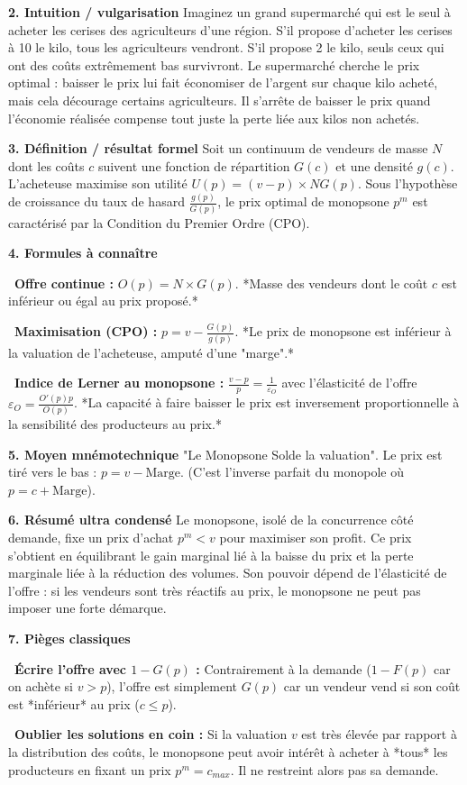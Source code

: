\documentclass[11pt, a4paper]{report}
\begin{document}
\textbf{2. Intuition / vulgarisation}
Imaginez un grand supermarché qui est le seul à acheter les cerises des agriculteurs d'une région. S'il propose d'acheter les cerises à 10\texteuro{} le kilo, tous les agriculteurs vendront. S'il propose 2\texteuro{} le kilo, seuls ceux qui ont des coûts extrêmement bas survivront. Le supermarché cherche le prix optimal : baisser le prix lui fait économiser de l'argent sur chaque kilo acheté, mais cela décourage certains agriculteurs. Il s'arrête de baisser le prix quand l'économie réalisée compense tout juste la perte liée aux kilos non achetés.

\textbf{3. Définition / résultat formel}
Soit un continuum de vendeurs de masse $N$ dont les coûts $c$ suivent une fonction de répartition $G(c)$ et une densité $g(c)$. 
L'acheteuse maximise son utilité $U(p) = (v-p) \times N G(p)$.
Sous l'hypothèse de croissance du taux de hasard $\frac{g(p)}{G(p)}$, le prix optimal de monopsone $p^m$ est caractérisé par la Condition du Premier Ordre (CPO).

\textbf{4. Formules à connaître}
\par \textbullet\ \textbf{Offre continue :} $O(p) = N \times G(p)$. *Masse des vendeurs dont le coût $c$ est inférieur ou égal au prix proposé.*
\par \textbullet\ \textbf{Maximisation (CPO) :} $p = v - \frac{G(p)}{g(p)}$. *Le prix de monopsone est inférieur à la valuation de l'acheteuse, amputé d'une "marge".*
\par \textbullet\ \textbf{Indice de Lerner au monopsone :} $\frac{v - p}{p} = \frac{1}{\varepsilon_O}$ avec l'élasticité de l'offre $\varepsilon_O = \frac{O'(p)p}{O(p)}$. *La capacité à faire baisser le prix est inversement proportionnelle à la sensibilité des producteurs au prix.*

\textbf{5. Moyen mnémotechnique}
"Le Monopsone Solde la valuation". Le prix est tiré vers le bas : $p = v - \text{Marge}$. (C'est l'inverse parfait du monopole où $p = c + \text{Marge}$).

\textbf{6. Résumé ultra condensé}
Le monopsone, isolé de la concurrence côté demande, fixe un prix d'achat $p^m < v$ pour maximiser son profit. Ce prix s'obtient en équilibrant le gain marginal lié à la baisse du prix et la perte marginale liée à la réduction des volumes. Son pouvoir dépend de l'élasticité de l'offre : si les vendeurs sont très réactifs au prix, le monopsone ne peut pas imposer une forte démarque.

\textbf{7. Pièges classiques}
\par \textbullet\ \textbf{Écrire l'offre avec $1-G(p)$ :} Contrairement à la demande ($1-F(p)$ car on achète si $v>p$), l'offre est simplement $G(p)$ car un vendeur vend si son coût est *inférieur* au prix ($c \le p$).
\par \textbullet\ \textbf{Oublier les solutions en coin :} Si la valuation $v$ est très élevée par rapport à la distribution des coûts, le monopsone peut avoir intérêt à acheter à *tous* les producteurs en fixant un prix $p^m = c_{max}$. Il ne restreint alors pas sa demande.
\end{document}

